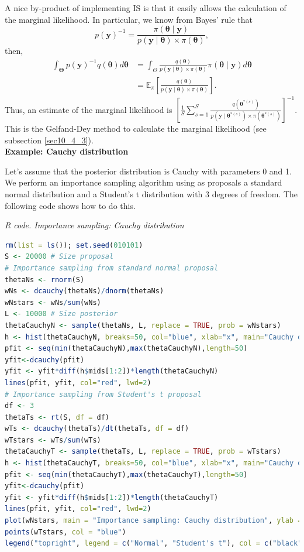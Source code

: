 A nice by-product of implementing IS is that it easily allows the calculation of the marginal likelihood. In particular, we know from Bayes' rule that
$$p(\bm{y})^{-1}=\frac{\pi(\bm{\theta}\mid \bm{y})}{p(\bm{y}\mid \bm{\theta})\times \pi(\bm{\theta})},$$
then, 
\begin{align*}
	\int_{\bm{\Theta}}p(\bm{y})^{-1}q(\bm{\theta})d\bm{\theta}&=\int_{{\Theta}}\frac{q(\bm{\theta})}{p(\bm{y}\mid \bm{\theta})\times \pi(\bm{\theta})}\pi(\bm{\theta}\mid \bm{y})d\bm{\theta}\\
	&=\mathbb{E}_{\pi}\left[\frac{q(\bm{\theta})}{p(\bm{y}\mid \bm{\theta})\times \pi(\bm{\theta})}\right].
\end{align*}
Thus, an estimate of the marginal likelihood is $\left[\frac{1}{S}\sum_{s=1}^S\frac{q(\bm{\theta}^{*(s)})}{p(\bm{y}\mid \bm{\theta}^{*(s)})\times\pi(\bm{\theta}^{*(s)})}\right]^{-1}$. This is the Gelfand-Dey method to calculate the marginal likelihood \cite{gelfand1994bayesian} (see subsection \ref{sec10_4_3}).\\

\textbf{Example: Cauchy distribution}

Let's assume that the posterior distribution is Cauchy with parameters 0 and 1. We perform an importance sampling algorithm using as proposals a standard normal distribution and a Student's t distribution with 3 degrees of freedom. The following code shows how to do this.

\begin{tcolorbox}[enhanced,width=4.67in,center upper,
	fontupper=\large\bfseries,drop shadow southwest,sharp corners]
	\textit{R code. Importance sampling: Cauchy distribution}
	\begin{VF}
		\begin{lstlisting}[language=R]
rm(list = ls()); set.seed(010101)
S <- 20000 # Size proposal
# Importance sampling from standard normal proposal 
thetaNs <- rnorm(S)
wNs <- dcauchy(thetaNs)/dnorm(thetaNs)
wNstars <- wNs/sum(wNs)
L <- 10000 # Size posterior
thetaCauchyN <- sample(thetaNs, L, replace = TRUE, prob = wNstars)
h <- hist(thetaCauchyN, breaks=50, col="blue", xlab="x", main="Cauchy draws from importance sampling: Normal standard proposal")
pfit <- seq(min(thetaCauchyN),max(thetaCauchyN),length=50)
yfit<-dcauchy(pfit)
yfit <- yfit*diff(h$mids[1:2])*length(thetaCauchyN)
lines(pfit, yfit, col="red", lwd=2)
# Importance sampling from Student's t proposal 
df <- 3
thetaTs <- rt(S, df = df)
wTs <- dcauchy(thetaTs)/dt(thetaTs, df = df)
wTstars <- wTs/sum(wTs)
thetaCauchyT <- sample(thetaTs, L, replace = TRUE, prob = wTstars)
h <- hist(thetaCauchyT, breaks=50, col="blue", xlab="x", main="Cauchy draws from importance sampling: Student's t proposal")
pfit <- seq(min(thetaCauchyT),max(thetaCauchyT),length=50)
yfit<-dcauchy(pfit)
yfit <- yfit*diff(h$mids[1:2])*length(thetaCauchyT)
lines(pfit, yfit, col="red", lwd=2)
plot(wNstars, main = "Importance sampling: Cauchy distribution", ylab = "Weights", xlab = "Iterations")
points(wTstars, col = "blue")
legend("topright", legend = c("Normal", "Student's t"), col = c("black", "blue"), pch = c(1, 1))
\end{lstlisting}
	\end{VF}
\end{tcolorbox} 


